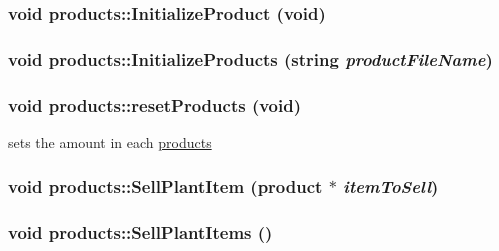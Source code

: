 \hypertarget{classproducts_ac69f5933f20409ff01e5bee8b7b02899}{
\subsubsection[{InitializeProduct}]{\setlength{\rightskip}{0pt plus 5cm}void products::InitializeProduct (void)}}
\label{classproducts_ac69f5933f20409ff01e5bee8b7b02899}
\hypertarget{classproducts_a4a370f5607ce63962bff3171ce7e8a62}{
\subsubsection[{InitializeProducts}]{\setlength{\rightskip}{0pt plus 5cm}void products::InitializeProducts (string {\em productFileName})}}
\label{classproducts_a4a370f5607ce63962bff3171ce7e8a62}
\hypertarget{classproducts_aa1d3d08b456680000b791f91f8238127}{
\subsubsection[{resetProducts}]{\setlength{\rightskip}{0pt plus 5cm}void products::resetProducts (void)}}
\label{classproducts_aa1d3d08b456680000b791f91f8238127}
sets the amount in each \hyperlink{classproducts}{products} \hypertarget{classproducts_a582a5c70832b8f9c53fb1103944c4bca}{
\subsubsection[{SellPlantItem}]{\setlength{\rightskip}{0pt plus 5cm}void products::SellPlantItem ({\bf product} $\ast$ {\em itemToSell})}}
\label{classproducts_a582a5c70832b8f9c53fb1103944c4bca}
\hypertarget{classproducts_aafdc02da42b92ae8cf0bb1a24664500d}{
\subsubsection[{SellPlantItems}]{\setlength{\rightskip}{0pt plus 5cm}void products::SellPlantItems ()}}
